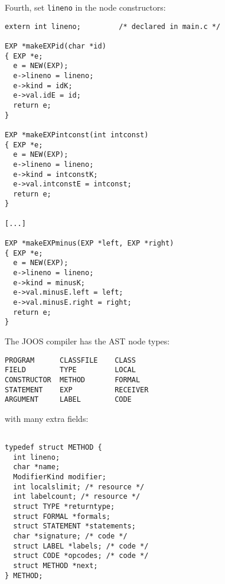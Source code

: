 \begin{slide*}
Fourth, set {\tt lineno} in the node constructors:
 
\begin{scriptsize}
\begin{verbatim}
extern int lineno;         /* declared in main.c */
 
EXP *makeEXPid(char *id)
{ EXP *e;
  e = NEW(EXP);
  e->lineno = lineno;
  e->kind = idK;
  e->val.idE = id;
  return e;
}
 
EXP *makeEXPintconst(int intconst)
{ EXP *e;
  e = NEW(EXP);
  e->lineno = lineno;
  e->kind = intconstK;
  e->val.intconstE = intconst;
  return e;
}

[...]

EXP *makeEXPminus(EXP *left, EXP *right)
{ EXP *e;
  e = NEW(EXP);
  e->lineno = lineno;
  e->kind = minusK;
  e->val.minusE.left = left;
  e->val.minusE.right = right;
  return e;
}
\end{verbatim}
\end{scriptsize}
\vfil
\end{slide*}
 
\begin{slide*}
The JOOS compiler has the AST node types:

\begin{scriptsize}
\begin{verbatim}
PROGRAM      CLASSFILE    CLASS 
FIELD        TYPE         LOCAL     
CONSTRUCTOR  METHOD       FORMAL
STATEMENT    EXP          RECEIVER
ARGUMENT     LABEL        CODE
\end{verbatim}
\end{scriptsize}

with many extra fields:

\begin{scriptsize}
\begin{verbatim}

typedef struct METHOD {
  int lineno;
  char *name;
  ModifierKind modifier; 
  int localslimit; /* resource */
  int labelcount; /* resource */
  struct TYPE *returntype;
  struct FORMAL *formals;
  struct STATEMENT *statements;
  char *signature; /* code */
  struct LABEL *labels; /* code */
  struct CODE *opcodes; /* code */
  struct METHOD *next;
} METHOD;
\end{verbatim}
\end{scriptsize}
\vfil
\end{slide*}
 
